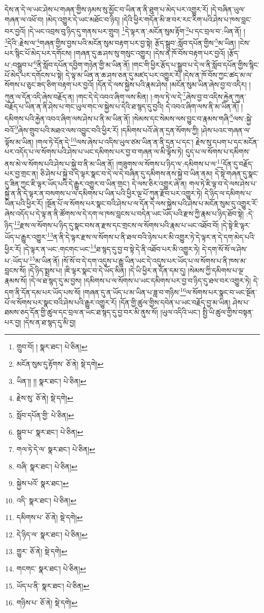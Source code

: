 དེས་ན་དེ་ལ་ཡང་ཤེས་པ་གཞན་གྱིས་ཉམས་སུ་མྱོང་བ་ཡིན་ན་ནི་ཐུག་པ་མེད་པར་འགྱུར་རོ། །དེ་བཞིན་ཡུལ་གཞན་ལ་འཕོ་བ། །མེད་འགྱུར་དེ་ཡང་མཐོང་བ་ཉིད། །དེའི་ཕྱིར་གདོན་མི་ཟ་བར་རང་རིག་པའི་ཤེས་པ་ཁས་བླང་བར་བྱའོ། །དེ་ཡང་འབྲས་བུ་ཉིད་དུ་གནས་པར་གྲུབ། \footnote{གྲུབ་བོ། །   སྣར་ཐང་།  པེ་ཅིན། }དེ་ལྟར་ན་:མངོན་སུམ་རྟོག་\footnote{མངོན་སུམ་དུ་རྟོགས་  ཅོ་ནེ།  སྡེ་དགེ། }པ་དང་བྲལ་བ་:ཡིན་ནོ། །\footnote{ཡིན་།། །།  སྣར་ཐང་།  པེ་ཅིན། }དེའི་:རྗེས་ལ་\footnote{རྗེས་སུ་  ཅོ་ནེ།  སྡེ་དགེ། }གཞན་གྱིས་བྱས་པའི་མངོན་སུམ་བརྟག་པར་བྱ་སྟེ། རྩོད་སྒྲུབ་:སློབ་དཔོན་གྱིས་\footnote{སློབ་དཔོན་གྱི་  པེ་ཅིན། }མ་ཡིན། །ངེས་པར་སྙིང་པོ་མེད་པར་དགོངས། །གཞན་དུ་ཆ་ཤས་སུ་གསུང་འགྱུར། །དེས་ན་ཁོ་བོས་བརྟག་པར་བྱའོ། །རྩོད་པ་:བསྒྲུབ་པ་\footnote{སྒྲུབ་པ་  སྣར་ཐང་།  པེ་ཅིན། }ནི་སློབ་དཔོན་དབྱིག་གཉེན་གྱི་མ་ཡིན་ནོ། །གང་གི་ཕྱིར་རྩོད་པ་སྒྲུབ་པ་དེ་ལ་ནི་སློབ་དཔོན་གྱིས་སྙིང་པོ་མེད་པར་དགོངས་པ་སྟེ། དེ་ལྟ་མ་ཡིན་ན་ཆ་ཤས་ཅན་དུ་མཛད་པར་འགྱུར་རོ། །དེས་ན་ཁོ་བོས་ཀྱང་ཚད་མ་ལ་སོགས་པ་ཅུང་ཟད་ཅིག་བརྟག་པར་བྱའོ། །དོན་དེ་ལས་སྐྱེས་པའི་རྣམ་ཤེས། །མངོན་སུམ་ཡིན་ཞེས་བྱ་བ་འདིར། །ཀུན་ལ་དོན་འདི་ཞེས་བརྗོད་ན། །གང་དེ་དེ་འབའ་ཞིག་ལས་མིན། །:གལ་ཏེ་ལ་དེ་\footnote{གལ་ཏེ་དེ་ལ་  སྣར་ཐང་།  པེ་ཅིན། }ཞེས་བྱ་བ་འདིས་རྐྱེན་ཀུན་བརྗོད་པ་ཡིན་ན་ནི་ཤེས་པ་གང་ཡུལ་གང་ལ་སྐྱེས་པ་དེའི་ཐ་སྙད་དུ་བྱའི། དེ་འབའ་ཞིག་ལས་ནི་མ་ཡིན་ནོ། །དམིགས་པའི་རྐྱེན་འབའ་ཞིག་ལས་ཤེས་པ་ནི་མ་ཡིན་ནོ། །སེམས་དང་སེམས་ལས་བྱུང་བ་རྣམས་གཞི་\footnote{བཞི་  སྣར་ཐང་།  པེ་ཅིན། }ལས་:སྐྱེ་བའོ་\footnote{སྐྱེས་པའོ་  སྣར་ཐང་། }ཞེས་གྲུབ་པའི་མཐའ་ལས་འབྱུང་བའི་ཕྱིར་རོ། །དམིགས་པའོ་ཞེ་ན་དྲན་སོགས་ཀྱི། །ཤེས་པའང་གཞན་ལ་ལྟོས་མ་ཡིན། །གལ་ཏེ་དོན་དེ་\footnote{འདི་  སྣར་ཐང་།  པེ་ཅིན། }ལས་ཞེས་པ་འདིས་ཡུལ་ཙམ་ཡིན་ན་ནི་དྲན་པ་དང་། རྗེས་སུ་དཔག་པ་དང་མངོན་པར་འདོད་པ་ལ་སོགས་པའི་ཤེས་པ་ཡང་དམིགས་པར་བྱ་བ་གཞན་ལ་མི་ལྟོས་ཏེ། དུད་པ་ལ་སོགས་པ་དམིགས་ནས་མེ་ལ་སོགས་པའི་ཤེས་པ་སྐྱེ་བ་ནི་མ་ཡིན་ནོ། །གཟུགས་ལ་སོགས་པ་ཉིད་ལ་:དམིགས་པ་ལ་\footnote{དམིགས་པ་  ཅོ་ནེ།  སྡེ་དགེ། }དོན་དུ་བརྗོད་པར་བྱ་གྲང་ན། ཅི་ཤེས་པ་སྐྱེ་བ་དེ་ལྟར་སྣང་བ་དེ་ལ་དེ་བཞིན་དུ་དམིགས་ནས་སྐྱེ་བ་ཡིན་ནམ། དེ་སྟེ་གཞན་དུ་སྣང་དུ་ཟིན་ཀྱང་ཇི་ལྟར་ཡོད་པའི་དེ་རྒྱུར་འགྱུར་བ་ཡིན་གྲང་། དེ་ལས་ཅིར་འགྱུར་ཞེ་ན། གལ་ཏེ་ཇི་ལྟ་བ་དེ་ལས་ཤེས་པ་སྐྱེ་ན་ནི་དེ་ལྟར་ན་བསགས་པ་ལ་དམིགས་པ་ཡིན་པའི་ཕྱིར་ལྔ་པོ་ཀུན་རྫོབ་པར་འགྱུར་ཏེ། དེ་ཉིད་ལ་དམིགས་པ་ཡིན་པའི་ཕྱིར་རོ། །སྔོན་པོ་ལ་སོགས་པར་སྣང་བའི་ཤེས་པ་ལ་དོན་དེ་ལས་སྐྱེས་པའི་ཤེས་པ་མངོན་སུམ་དུ་འགྱུར་རོ་ཞེས་འདོད་པ་དེ་ལྟ་ན་ནི་ཚོགས་ལ་དེ་དག་ལ་ཁས་བླངས་པ་བདེན་ཡང་ཡོད་པའི་རྫས་ཀྱི་རྣམ་པ་ཉིད་ཐོབ་སྟེ། :དེ་ཉིད་\footnote{དེ་ཉིད་ལ་  སྣར་ཐང་།  པེ་ཅིན། }རྫས་ལ་སོགས་པ་ཉིད་དུ་སྣང་བས་ན་རྫས་དང་གྲངས་ལ་སོགས་པའི་རྣམ་པ་ཡང་འཐོབ་བོ། །དེ་སྟེ་ཇི་ལྟར་ཡོད་པ་རྒྱུར་འགྱུར་\footnote{གྱུར་  ཅོ་ནེ།  སྡེ་དགེ། }ན་ནི་དེ་ལྟར་རྫས་ལ་སོགས་པ་ནི་ཐལ་བའི་ཉེས་པར་མི་འགྱུར་ཏེ་དེ་ལྟར་ན་དེ་དག་མེད་པའི་ཕྱིར་རོ། །དེ་ལྟར་ན་ཡང་:གངགང་ཡང་\footnote{གངགང་  སྣར་ཐང་།  པེ་ཅིན། }ཐ་སྙད་དུ་བྱ་བ་སྟེ་དེ་ནི་འཐོབ་པར་མི་འགྱུར་ཏེ། དེ་དག་སོ་སོ་ལ་ཤེས་པ་:ཡོད་པ་\footnote{ཡོད་པ་ནི་  སྣར་ཐང་།  པེ་ཅིན། }མ་ཡིན་ནོ། །སོ་སོ་བ་དེ་དག་འདུས་པ་རྒྱུ་ཡིན་ཡང་དེ་འདུས་པར་ཡོད་པ་ལ་སོགས་པ་ནི་ཁས་མ་བླངས་སོ། །དེ་ཉིད་སྨྲས་པ། །ཇི་ལྟར་སྣང་བ་དེ་ཡོད་མིན། །དེ་ཡི་ཕྱིར་ན་དོན་དམ་དུ། །སེམས་ཀྱི་དམིགས་པ་ལྔ་རྣམས་སོ། །དེ་ལ་ཐ་སྙད་དུ་མ་བྱས། །དམིགས་པ་ལ་སོགས་པ་ཡང་དམིགས་པར་བྱ་བ་ཉིད་དུ་ཐལ་བར་འགྱུར་ཏེ། དེ་དག་ནི་དོན་དམ་པར་ཡོད་པས་སོ། །གཞན་དུ་ན་ཡོད་པ་མ་ཡིན་པ་ཟླ་བ་གཉིས་\footnote{གཉིས་པ་  ཅོ་ནེ།  སྡེ་དགེ། }ལ་སོགས་པར་སྣང་བ་ཡང་སྔོན་པོ་ལ་སོགས་པར་སྣང་བའི་ཤེས་པའི་རྒྱུར་འགྱུར་རོ། །དོན་གྱི་ཚུལ་གྱིས་དབེན་པ་ཡང་བརྗོད་བྱ་མ་ཡིན། ཤེས་པ་ཐམས་ཅད་དོན་གྱི་ཚུལ་དང་བྲལ་ན་ཡང་ཐ་སྙད་དུ་བྱ་བར་མི་ནུས་སོ། །ཡུལ་འདིའི་ཡང་། སྤྱི་ཡི་ཚུལ་གྱིས་བསྟན་པར་བྱ། །དེས་ན་ཐ་སྙད་དུ་མི་བྱ། 